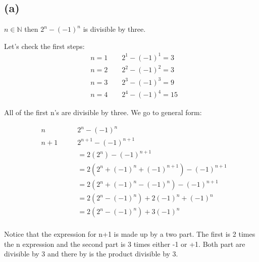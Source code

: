 



\section{}%

\subsection*{(a)}


$n \in \mathbb{N}$ then $2^n - (-1)^n$ is divisible by three.


Let's check the first steps: 
\begin{align*}
&n = 1 \qquad 2^1 - (-1)^1 = 3\\
&n = 2 \qquad 2^2 - (-1)^2 = 3\\
&n = 3 \qquad 2^3 - (-1)^3 = 9\\
&n = 4 \qquad 2^4 - (-1)^4 = 15
\end{align*}

All of the first n's are divisible by three. 
We go to general form: 

\begin{align*}
&n \qquad &2^n - (-1)^n\\
&n+1 \qquad &2^{n+1} - (-1)^{n+1} \\
& &= 2(2^{n}) - (-1)^{n+1}\\
& &= 2(2^{n} + (-1)^n  + (-1)^{n+1}) - (-1)^{n+1}\\
& &= 2(2^{n} + (-1)^n  - (-1)^{n}) - (-1)^{n+1}\\
& &= 2(2^{n}- (-1)^{n}) + 2(-1)^n  + (-1)^{n}\\
& &= 2(2^{n}- (-1)^{n}) + 3(-1)^n \\
\end{align*}

Notice that the expression for n+1 is made up by a two part. The first is 2 times the n expression and the second part is 3 times either -1 or +1. Both part are divisible by 3 and there by is the product divisible by 3. 








